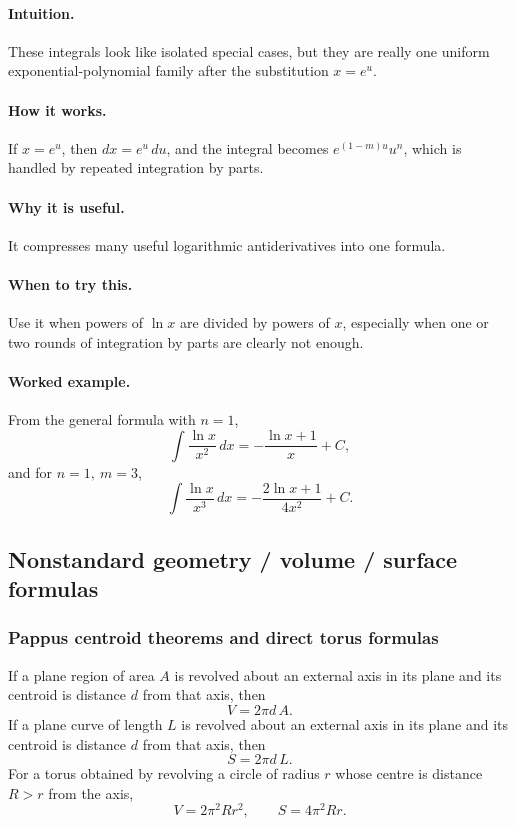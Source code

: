\documentclass[12pt]{article}
\begin{document}
\paragraph{Intuition.}
These integrals look like isolated special cases, but they are really one uniform exponential-polynomial family after the substitution \(x=e^u\).

\paragraph{How it works.}
If \(x=e^u\), then \(dx=e^u\,du\), and the integral becomes \(e^{(1-m)u}u^n\), which is handled by repeated integration by parts.

\paragraph{Why it is useful.}
It compresses many useful logarithmic antiderivatives into one formula.

\paragraph{When to try this.}
Use it when powers of \(\ln x\) are divided by powers of \(x\), especially when one or two rounds of integration by parts are clearly not enough.

\paragraph{Worked example.}
From the general formula with \(n=1\),
\[
\int \frac{\ln x}{x^2}\,dx
=-\frac{\ln x+1}{x}+C,
\]
and for \(n=1,\ m=3\),
\[
\int \frac{\ln x}{x^3}\,dx
=-\frac{2\ln x+1}{4x^2}+C.
\]


\newpage
\subsection{Nonstandard geometry / volume / surface formulas}
\subsubsection{Pappus centroid theorems and direct torus formulas}
If a plane region of area \(A\) is revolved about an external axis in its plane and its centroid is distance \(d\) from that axis, then
\[
V=2\pi d\,A.
\]
If a plane curve of length \(L\) is revolved about an external axis in its plane and its centroid is distance \(d\) from that axis, then
\[
S=2\pi d\,L.
\]
For a torus obtained by revolving a circle of radius \(r\) whose centre is distance \(R>r\) from the axis,
\[
V=2\pi^2 Rr^2,
\qquad
S=4\pi^2 Rr.
\]
\end{document}
